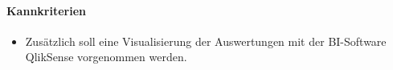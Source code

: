 \paragraph{Kannkriterien}

\begin{itemize}
  \item Zusätzlich soll eine Visualisierung der Auswertungen mit der BI-Software QlikSense vorgenommen werden.
\end{itemize}


